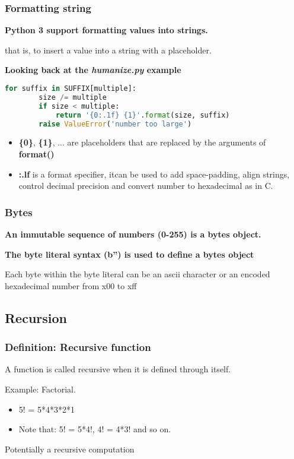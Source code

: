 \subsubsection{Formatting string}
\textbf{Python 3 support formatting values into strings.}

that is, to insert a value into a string with a placeholder.

\textbf{Looking back at the \textit{humanize.py} example}
\begin{lstlisting}[language=Python]
for suffix in SUFFIX[multiple]:
		size /= multiple
		if size < multiple:
			return '{0:.1f} {1}'.format(size, suffix)
		raise ValueError('number too large')
\end{lstlisting}
\begin{itemize}
	\item  \textbf{\{0\}}, \textbf{\{1\}}, ... are placeholders that are replaced by the arguments of \textbf{format()}
	\item  \textbf{:.lf} is a format specifier, itcan be used to add space-padding, align strings, control decimal precision and convert number to hexadecimal as in C.
\end{itemize}

\subsubsection{Bytes}
\textbf{An immutable sequence of numbers (0-255) is a bytes object.}

\textbf{The byte literal syntax (b'') is used to define a bytes object}

Each byte within the byte literal can be an ascii character or an encoded hexadecimal number from x00 to xff 

\subsection{Recursion}
\subsubsection{Definition: Recursive function}
A function is called recursive when it is defined through itself.

Example: Factorial.
\begin{itemize}
	\item 5! = 5*4*3*2*1
	\item Note that: 5! = 5*4!, 4! = 4*3! and so on.
\end{itemize}
Potentially a recursive computation

